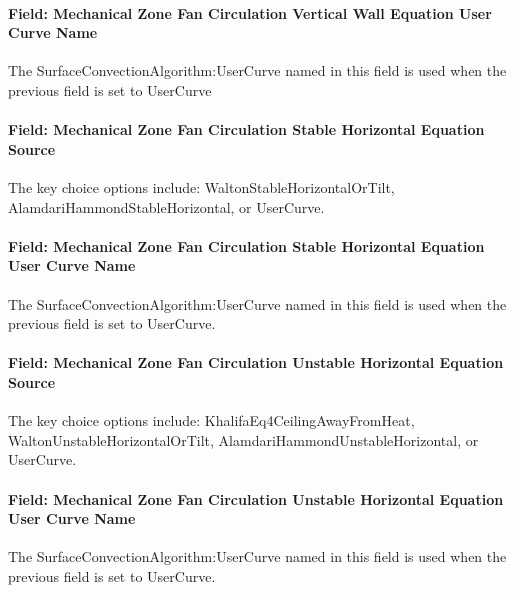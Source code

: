 \paragraph{Field: Mechanical Zone Fan Circulation Vertical Wall Equation User Curve Name}\label{field-mechanical-zone-fan-circulation-vertical-wall-equation-user-curve-name}

The SurfaceConvectionAlgorithm:UserCurve named in this field is used when the previous field is set to UserCurve

\paragraph{Field: Mechanical Zone Fan Circulation Stable Horizontal Equation Source}\label{field-mechanical-zone-fan-circulation-stable-horizontal-equation-source}

The key choice options include: WaltonStableHorizontalOrTilt, AlamdariHammondStableHorizontal, or UserCurve.

\paragraph{Field: Mechanical Zone Fan Circulation Stable Horizontal Equation User Curve Name}\label{field-mechanical-zone-fan-circulation-stable-horizontal-equation-user-curve-name}

The SurfaceConvectionAlgorithm:UserCurve named in this field is used when the previous field is set to UserCurve.

\paragraph{Field: Mechanical Zone Fan Circulation Unstable Horizontal Equation Source}\label{field-mechanical-zone-fan-circulation-unstable-horizontal-equation-source}

The key choice options include: KhalifaEq4CeilingAwayFromHeat, WaltonUnstableHorizontalOrTilt, AlamdariHammondUnstableHorizontal, or UserCurve.

\paragraph{Field: Mechanical Zone Fan Circulation Unstable Horizontal Equation User Curve Name}\label{field-mechanical-zone-fan-circulation-unstable-horizontal-equation-user-curve-name}

The SurfaceConvectionAlgorithm:UserCurve named in this field is used when the previous field is set to UserCurve.

